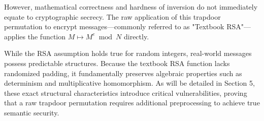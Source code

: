 However, mathematical correctness and hardness of inversion do not immediately equate to cryptographic secrecy. The raw application of this trapdoor permutation to encrypt messages---commonly referred to as "Textbook RSA"---applies the function $M \mapsto M^e \bmod N$ directly. 

While the RSA assumption holds true for random integers, real-world messages possess predictable structures. Because the textbook RSA function lacks randomized padding, it fundamentally preserves algebraic properties such as determinism and multiplicative homomorphism. As will be detailed in Section 5, these exact structural characteristics introduce critical vulnerabilities, proving that a raw trapdoor permutation requires additional preprocessing to achieve true semantic security.
